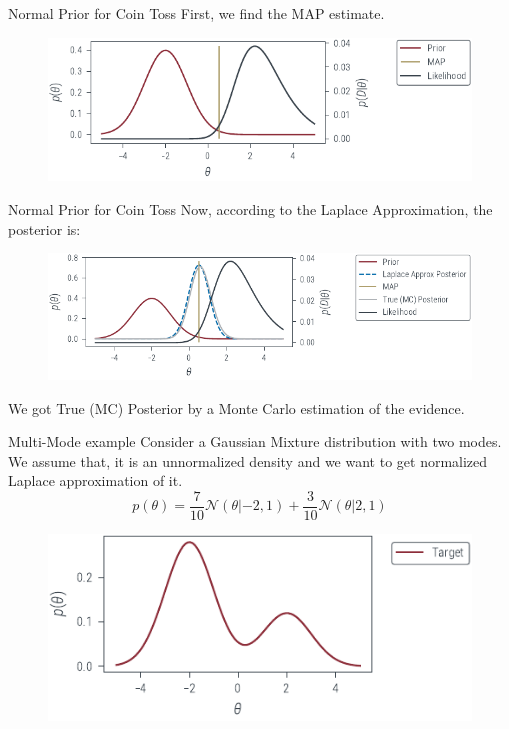 \documentclass{beamer}
\begin{document}
\begin{frame}{Normal Prior for Coin Toss}
    First, we find the MAP estimate.
    \begin{figure}
        \includegraphics[]{../figures/laplace-approx/normal-prior-coin-toss-map.pdf}
    \end{figure}
\end{frame}

\begin{frame}{Normal Prior for Coin Toss}
    Now, according to the Laplace Approximation, the posterior is:
    \begin{figure}
        \includegraphics[]{../figures/laplace-approx/normal-prior-coin-toss-laplace.pdf}
    \end{figure}
    We got True (MC) Posterior by a Monte Carlo estimation of the evidence.
\end{frame}

\begin{frame}{Multi-Mode example}
    Consider a Gaussian Mixture distribution with two modes. We assume that, it is an unnormalized density and we want to get normalized Laplace approximation of it.
    \pause
    \begin{equation*}
        p(\theta) = \frac{7}{10}\mathcal{N}(\theta|-2, 1) + \frac{3}{10}\mathcal{N}(\theta|2, 1)
    \end{equation*}
    \pause
    \begin{figure}
        \includegraphics[]{../figures/laplace-approx/mixture-density.pdf}
    \end{figure}

\end{frame}
\end{document}
